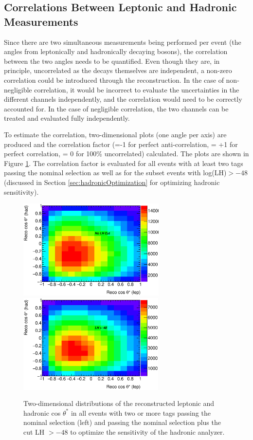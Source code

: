 \subsection{Correlations Between Leptonic and Hadronic Measurements}
Since there are two simultaneous measurements being performed per event (the angles from leptonically and hadronically decaying \w bosons), the correlation between the two angles needs to be quantified. Even though they are, in principle, uncorrelated as the decays themselves are independent, a non-zero correlation could be introduced through the reconstruction. In the case of non-negligible correlation, it would be incorrect to evaluate the uncertainties in the different channels independently, and the correlation would need to be correctly accounted for. In the case of negligible correlation, the two channels can be treated and evaluated fully independently.

To estimate the correlation, two-dimensional plots (one angle per axis) are produced and the correlation factor (=-1 for perfect anti-correlation, = +1 for perfect correlation, = 0 for 100\% uncorrelated) calculated. The plots are shown in Figure \ref{fig:twoD_correlation}. The correlation factor is evaluated for all events with at least two \bt tags passing the nominal selection as well as for the subset events with log(LH)$>-48$ (discussed in Section \ref{sec:hadronicOptimization} for optimizing hadronic sensitivity).

\begin{figure}[htbp]
  \begin{center}
    \includegraphics[height=50mm]{chapters/whel/figures/twoDimCorrelation/costheta_2D_noLH}
    \includegraphics[height=50mm]{chapters/whel/figures/twoDimCorrelation/costheta_2D_withLH}
    \caption{Two-dimensional distributions of the reconstructed leptonic and hadronic cos $\theta^*$ in all events with two or more \bt tags passing the nominal selection (left) and passing the nominal selection plus the cut LH $>-48$ to optimize the sensitivity of the hadronic analyzer.}
    \label{fig:twoD_correlation}
  \end{center}
\end{figure}

